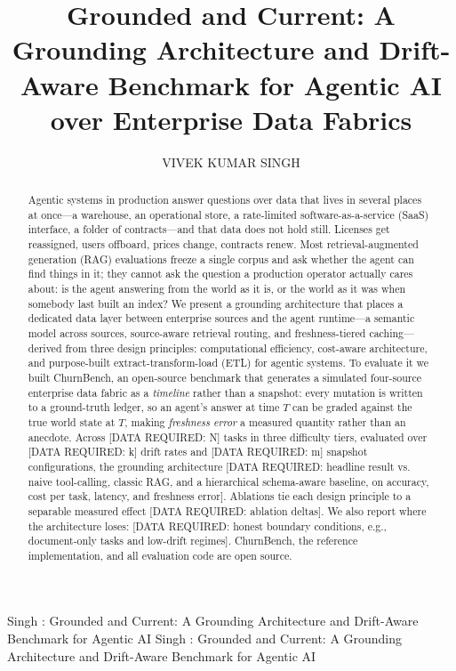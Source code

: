 \documentclass{ieeeaccess}
\begin{document}

\title{Grounded and Current: A Grounding Architecture and Drift-Aware Benchmark
for Agentic AI over Enterprise Data Fabrics}

\author{
\uppercase{Vivek Kumar Singh}
}
\address[1]{Independent Researcher (e-mail: vivekksingh.nov12@gmail.com)}
\tfootnote{}

\markboth
{Singh \headeretal: Grounded and Current: A Grounding Architecture and Drift-Aware Benchmark for Agentic AI}
{Singh \headeretal: Grounded and Current: A Grounding Architecture and Drift-Aware Benchmark for Agentic AI}


\begin{abstract}
Agentic systems in production answer questions over data that lives in several
places at once---a warehouse, an operational store, a rate-limited software-as-a-service
(SaaS) interface, a folder of contracts---and that data does not hold still. Licenses
get reassigned, users offboard, prices change, contracts renew. Most retrieval-augmented
generation (RAG) evaluations freeze a single corpus and ask whether the agent can find
things in it; they cannot ask the question a production operator actually cares about:
is the agent answering from the world as it is, or the world as it was when somebody
last built an index? We present a grounding architecture that places a dedicated data
layer between enterprise sources and the agent runtime---a semantic model across
sources, source-aware retrieval routing, and freshness-tiered caching---derived from
three design principles: computational efficiency, cost-aware architecture, and
purpose-built extract-transform-load (ETL) for agentic systems. To evaluate it we
built ChurnBench, an open-source benchmark that generates a simulated four-source
enterprise data fabric as a \emph{timeline} rather than a snapshot: every mutation is
written to a ground-truth ledger, so an agent's answer at time $T$ can be graded
against the true world state at $T$, making \emph{freshness error} a measured
quantity rather than an anecdote. Across
[DATA REQUIRED: N] tasks in three difficulty tiers, evaluated over
[DATA REQUIRED: k] drift rates and [DATA REQUIRED: m] snapshot configurations,
the grounding architecture
[DATA REQUIRED: headline result vs. naive tool-calling, classic RAG, and a
hierarchical schema-aware baseline, on accuracy, cost per task, latency, and
freshness error]. Ablations tie each design principle to a separable measured
effect [DATA REQUIRED: ablation deltas]. We also report where the architecture
loses: [DATA REQUIRED: honest boundary conditions, e.g., document-only tasks and
low-drift regimes]. ChurnBench, the reference implementation, and all evaluation
code are open source.
\end{abstract}
\end{document}
